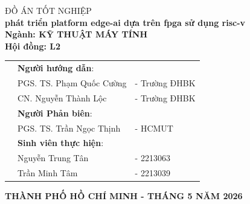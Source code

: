 \begin{titlepage}
\begin{center}
\vspace{1 cm}
{\makeatletter
\large\titlestyle ĐỒ ÁN TỐT NGHIỆP\\
\vspace{0.5cm}
\titlestyle\bfseries\LARGE phát triển platform edge-ai dựa trên fpga sử dụng risc-v\\
\vspace{1cm}
\large\titlestyle Ngành: KỸ THUẬT MÁY TÍNH\\
\titlestyle Hội đồng: L2
\makeatother}

\vspace{0.75cm}

\begin{table}[h!]
\begin{tabular}{lll}
\hspace{1cm}
& \hspace{-0.5 cm} \vspace{0.25cm} \textbf{Người hướng dẫn}: &\\
& PGS. TS. Phạm Quốc Cường &- Trường ĐHBK\\
\vspace{0.25cm} & CN. Nguyễn Thành Lộc &- Trường ĐHBK\\ 
& \hspace{-0.5 cm} \vspace{0.25cm} \textbf{Người Phản biên}: &\\
\vspace{0.25cm} & PGS. TS. Trần Ngọc Thịnh &- HCMUT\\
& \hspace{-0.5 cm} \vspace{0.25cm} \textbf{Sinh viên thực hiện}: &\\
\vspace{0.25cm} & Nguyễn Trung Tân &- 2213063\\
\vspace{0.25cm} & Trần Minh Tâm &- 2213039\\
\end{tabular}
\end{table}

\vfill

{\titlefont\bfseries THÀNH PHỐ HỒ CHÍ MINH - THÁNG 5 NĂM 2026}
\end{center}

\cleardoublepage
\thispagestyle{empty}


\clearpage
\thispagestyle{empty}

\end{titlepage}

